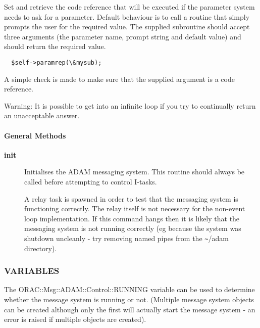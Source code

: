 \begin{description}
Set and retrieve the code reference that will be executed if
the parameter system needs to ask for a parameter.
Default behaviour is to call a routine that simply prompts
the user for the required value. The supplied subroutine
should accept three arguments (the parameter name, prompt string and
default value) and should return the required value.

\begin{verbatim}
  $self->paramrep(\&mysub);
\end{verbatim}


A simple check is made to make sure that the supplied argument
is a code reference.



Warning: It is possible to get into an infinite loop if you try
to continually return an unacceptable answer.

\end{description}
\paragraph*{General Methods\label{ORAC::Msg::ADAM::Control_General_Methods}}\begin{description}
\item[\textbf{init}] \mbox{}

Initialises the ADAM messaging system. This routine should always be
called before attempting to control I-tasks.



A relay task is spawned in order to test that the messaging system
is functioning correctly. The relay itself is not necessary for the
non-event loop implementation. If this command hangs then it is
likely that the messaging system is not running correctly (eg
because the system was shutdown uncleanly - try removing named pipes
from the \texttt{\~{}}/adam directory).

\end{description}
\subsubsection*{VARIABLES\label{ORAC::Msg::ADAM::Control_VARIABLES}}

The ORAC::Msg::ADAM::Control::RUNNING variable can be 
used to determine whether the message system is running or not.
(Multiple message system objects can be created although only
the first will actually start the message system - an error is raised
if multiple objects are created).

